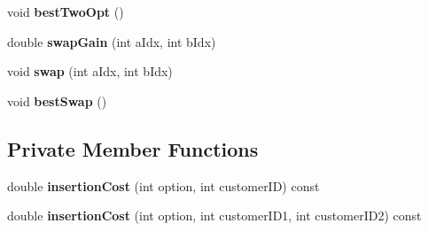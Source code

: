 \begin{DoxyCompactItemize}
void {\bfseries best\+Two\+Opt} ()
\item 
\mbox{\label{class_vehicle_a738c59dd2399d2bc1198db5e44be3db9}} 
double {\bfseries swap\+Gain} (int a\+Idx, int b\+Idx)
\item 
\mbox{\label{class_vehicle_a5ba7b2efd185ad5b567146c5249a3465}} 
void {\bfseries swap} (int a\+Idx, int b\+Idx)
\item 
\mbox{\label{class_vehicle_ae3da9e9bc42637d5f8d2beac2cf93ef3}} 
void {\bfseries best\+Swap} ()
\end{DoxyCompactItemize}
\subsection*{Private Member Functions}
\begin{DoxyCompactItemize}
\item 
\mbox{\label{class_vehicle_a611644994428f25ca7c1e83d47dc1626}} 
double {\bfseries insertion\+Cost} (int option, int customer\+ID) const
\item 
\mbox{\label{class_vehicle_a8823f29268056ded45bac81098b7d58e}} 
double {\bfseries insertion\+Cost} (int option, int customer\+I\+D1, int customer\+I\+D2) const
\end{DoxyCompactItemize}
